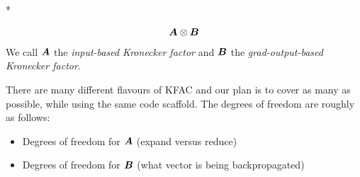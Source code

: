 \switchcolumn[1]*
\switchcolumn[0]


\begin{align*}
   {\bm{A}} \otimes {\bm{B}}
\end{align*}
We call ${\bm{A}}$ the \emph{input-based Kronecker factor} and ${\bm{B}}$ the \emph{grad-output-based Kronecker factor}.

There are many different flavours of KFAC and our plan is to cover as many as possible, while using the same code scaffold. The degrees of freedom are roughly as follows:
\begin{itemize}
\item Degrees of freedom for ${\bm{A}}$ (expand versus reduce)
\item Degrees of freedom for ${\bm{B}}$ (what vector is being backpropagated)
\end{itemize}



